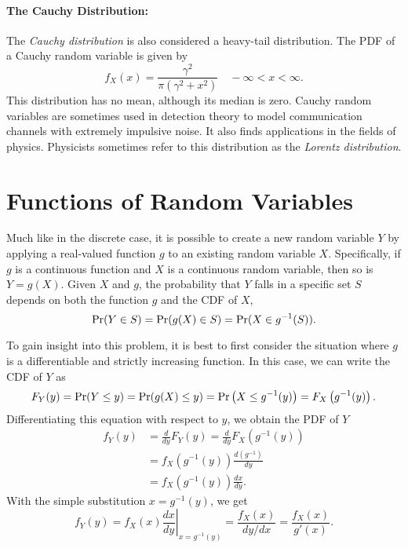 \paragraph{The Cauchy Distribution:}
The \emph{Cauchy distribution} is also considered a heavy-tail distribution.
The PDF of a Cauchy random variable is given by
\begin{equation*}
f_X (x) = \frac{ \gamma^2 }{\pi \left( \gamma^2 + x^2 \right)} \quad - \infty < x < \infty.
\end{equation*}
This distribution has no mean, although its median is zero.
Cauchy random variables are sometimes used in detection theory to model communication channels with extremely impulsive noise.
It also finds applications in the fields of physics.
Physicists sometimes refer to this distribution as the \emph{Lorentz distribution}.


\section{Functions of Random Variables}

Much like in the discrete case, it is possible to create a new random variable $Y$ by applying a real-valued function $g$ to an existing random variable $X$.
Specifically, if $g$ is a continuous function and $X$ is a continuous random variable, then so is $Y = g(X)$.
Given $X$ and $g$, the probability that $Y$ falls in a specific set $S$ depends on both the function $g$ and the CDF of $X$,
\begin{equation*}
\Pr (Y \in S) = \Pr (g(X) \in S) 
= \Pr (X \in g^{-1}(S)).
\end{equation*}

To gain insight into this problem, it is best to first consider the situation where $g$ is a differentiable and strictly increasing function.
In this case, we can write the CDF of $Y$ as
\begin{equation*}
F_Y(y) = \Pr (Y \leq y) = \Pr (g(X) \leq y)
= \Pr \left( X \leq g^{-1}(y) \right)
= F_X \left( g^{-1} (y) \right) .
\end{equation*}
Differentiating this equation with respect to $y$, we obtain the PDF of $Y$
\begin{equation*}
\begin{split}
f_Y (y) &= \frac{d}{dy} F_Y(y)
= \frac{d}{dy} F_X \left( g^{-1} (y) \right) \\
&= f_X \left( g^{-1} (y) \right) \frac{d \left( g^{-1} \right)}{dy} \\
&= f_X \left( g^{-1} (y) \right) \frac{dx}{dy} .
\end{split}
\end{equation*}
With the simple substitution $x = g^{-1} (y)$, we get
\begin{equation*}
f_Y (y) = f_X (x) \left. \frac{dx}{dy} \right|_{x = g^{-1}(y)}
= \frac{f_X (x)}{{dy}/{dx}}
= \frac{f_X (x)}{g'(x)} .
\end{equation*}

